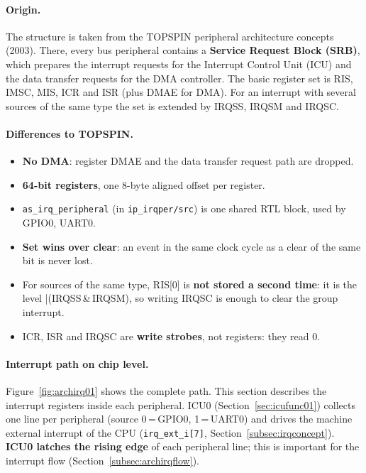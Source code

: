 \paragraph{Origin.}
The structure is taken from the TOPSPIN peripheral architecture concepts
(2003). There, every bus peripheral contains a \textbf{Service Request Block
(SRB)}, which prepares the interrupt requests for the Interrupt Control Unit
(ICU) and the data transfer requests for the DMA controller. The basic register
set is RIS, IMSC, MIS, ICR and ISR (plus DMAE for DMA). For an interrupt with
several sources of the same type the set is extended by IRQSS, IRQSM and IRQSC.

\paragraph{Differences to TOPSPIN.}
\begin{itemize}
  \item \textbf{No DMA}: register DMAE and the data transfer request path are dropped.
  \item \textbf{64-bit registers}, one 8-byte aligned offset per register.
  \item \texttt{as\_irq\_peripheral} (in \texttt{ip\_irqper/src}) is one shared
    RTL block, used by GPIO0, UART0.
  \item \textbf{Set wins over clear}: an event in the same clock cycle as a
    clear of the same bit is never lost.
  \item For sources of the same type, RIS[0] is \textbf{not stored a second
    time}: it is the level |(IRQSS\,\&\,IRQSM), so writing IRQSC is enough to
    clear the group interrupt.
  \item ICR, ISR and IRQSC are \textbf{write strobes}, not registers: they read 0.
\end{itemize}

\paragraph{Interrupt path on chip level.}
Figure~\ref{fig:archirq01} shows the complete path. This section describes the
interrupt registers inside each peripheral. ICU0 (Section~\ref{sec:icufunc01})
collects one line per peripheral (source 0\,=\,GPIO0, 1\,=\,UART0)
and drives the machine external interrupt of the CPU
(\texttt{irq\_ext\_i[7]}, Section~\ref{subsec:irqconcept}).
\textbf{ICU0 latches the rising edge} of each peripheral line; this is
important for the interrupt flow (Section~\ref{subsec:archirqflow}).

